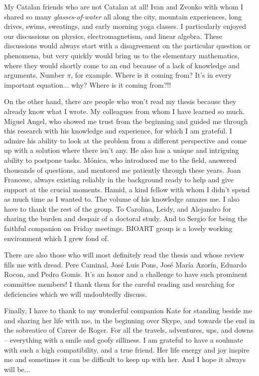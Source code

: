 \begin{acknowledgements}
My Catalan friends who are not Catalan at all! Ivan and Zvonko with whom I shared so many \emph{glasses-of-water} all along the city, mountain experiences, long drives, swims, sweatings, and early morning yoga classes. I particularly enjoyed our discussions on physics, electromagnetism, and linear algebra. These discussions would always start with a disagreement on the particular question or phenomena, but very quickly would bring us to the elementary mathematics, where they would shortly come to an end because of a lack of knowledge and arguments. Number $\pi$, for example. Where is it coming from? It's in every important equation... why? Where is it coming from?!!

On the other hand, there are people who won't read my thesis because they already know what I wrote. My colleagues from whom I have learned so much. Miguel Angel, who showed me trust from the beginning and guided me through this research with his knowledge and experience, for which I am grateful. I admire his ability to look at the problem from a different perspective and come up with a solution where there isn't any. He also has a unique and intriguing ability to postpone tasks. Mónica, who introduced me to the field, answered thousands of questions, and mentored me patiently through these years. Joan Francesc, always existing reliably in the background ready to help and give support at the crucial moments. Hamid, a kind fellow with whom I didn't spend as much time as I wanted to. The volume of his knowledge amazes me. I also have to thank the rest of the group. To Carolina, Leidy, and Alejandro for sharing the burden and despair of a doctoral study. And to Sergio for being the faithful companion on Friday meetings. BIOART group is a lovely working environment which I grew fond of.

There are also those who will most definitely read the thesis and whose review fills me with dread. Pere Caminal, José Luis Pons, José María Azorín, Eduardo Rocon, and Pedro Gomis. It's an honor and a challenge to have such prominent committee members! I thank them for the careful reading and searching for deficiencies which we will undoubtedly discuss.

Finally, I have to thank to my wonderful companion Kate for standing beside me and sharing her life with me, in the beginning over Skype, and towards the end in the sobreatico of Carrer de Roger. For all the travels, adventures, ups, and downs -- everything with a smile and goofy silliness. I am grateful to have a soulmate with such a high compatibility, and a true friend. Her life energy and joy inspire me and sometimes it can be difficult to keep up with her. And I hope it always will be...


\end{acknowledgements}

